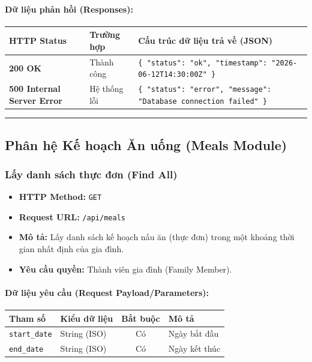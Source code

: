 \documentclass[12pt,a4paper]{article}
\begin{document}
\paragraph{Dữ liệu phản hồi (Responses):}
\begin{longtable}{|p{2.8cm}|p{3.2cm}|p{8.0cm}|}
\hline
\textbf{HTTP Status} & \textbf{Trường hợp} & \textbf{Cấu trúc dữ liệu trả về (JSON)} \\ \hline
\endhead
\textbf{200 OK} & Thành công & \texttt{\{ "status": "ok", "timestamp": "2026-06-12T14:30:00Z" \}} \\ \hline
\textbf{500 Internal Server Error} & Hệ thống lỗi & \texttt{\{ "status": "error", "message": "Database connection failed" \}} \\ \hline
\end{longtable}

\vskip 0.4cm
\noindent\rule{\textwidth}{0.3pt}
\vskip 0.4cm

\subsection{Phân hệ Kế hoạch Ăn uống (Meals Module)}

\subsubsection{Lấy danh sách thực đơn (Find All)}
\begin{itemize}[leftmargin=*]
    \item \textbf{HTTP Method:} \texttt{GET}
    \item \textbf{Request URL:} \texttt{/api/meals}
    \item \textbf{Mô tả:} Lấy danh sách kế hoạch nấu ăn (thực đơn) trong một khoảng thời gian nhất định của gia đình.
    \item \textbf{Yêu cầu quyền:} Thành viên gia đình (Family Member).
\end{itemize}

\paragraph{Dữ liệu yêu cầu (Request Payload/Parameters):}
\begin{longtable}{|p{2.8cm}|p{2.2cm}|c|p{7.0cm}|}
\hline
\textbf{Tham số} & \textbf{Kiểu dữ liệu} & \textbf{Bắt buộc} & \textbf{Mô tả} \\ \hline
\endhead
\texttt{start\_date} & String (ISO) & Có & Ngày bắt đầu \\ \hline
\texttt{end\_date} & String (ISO) & Có & Ngày kết thúc \\ \hline
\end{longtable}
\end{document}
